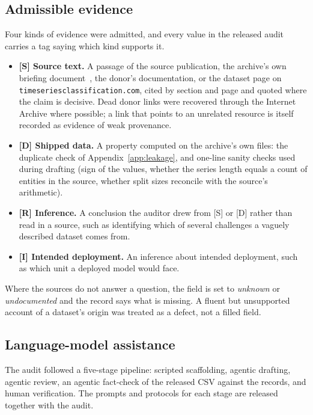 \subsection{Admissible evidence}
\label{app:evidence}

Four kinds of evidence were admitted, and every value in the released audit carries a tag
saying which kind supports it.

\begin{itemize}\setlength{\itemsep}{1pt}
  \item \textbf{[S] Source text.} A passage of the source publication, the archive's own
  briefing document~\cite{dau2019ucr}, the donor's documentation, or the dataset page on
  \texttt{timeseriesclassification.com}, cited by section and page and quoted where the
  claim is decisive. Dead donor links were recovered through the Internet Archive where
  possible; a link that points to an unrelated resource is itself recorded as evidence of
  weak provenance.
  \item \textbf{[D] Shipped data.} A property computed on the archive's own files: the
  duplicate check of Appendix~\ref{app:leakage}, and one-line sanity checks used during
  drafting (sign of the values, whether the series length equals a
  count of entities in the source, whether split sizes reconcile with the source's
  arithmetic).
  \item \textbf{[R] Inference.} A conclusion the auditor drew from [S] or [D] rather than
  read in a source, such as identifying which of several challenges a vaguely described
  dataset comes from.
  \item \textbf{[I] Intended deployment.} An inference about intended deployment, such as
  which unit a deployed model would face.
\end{itemize}

Where the sources do not answer a question, the field is set to \emph{unknown} or
\emph{undocumented} and the record says what is missing. A fluent but unsupported account
of a dataset's origin was treated as a defect, not a filled field.

\subsection{Language-model assistance}
\label{app:llm}

The audit followed a five-stage pipeline: scripted scaffolding, agentic drafting, agentic review, an agentic fact-check of the released CSV against the records, and human verification. The prompts and protocols for each stage are released together with the audit.

